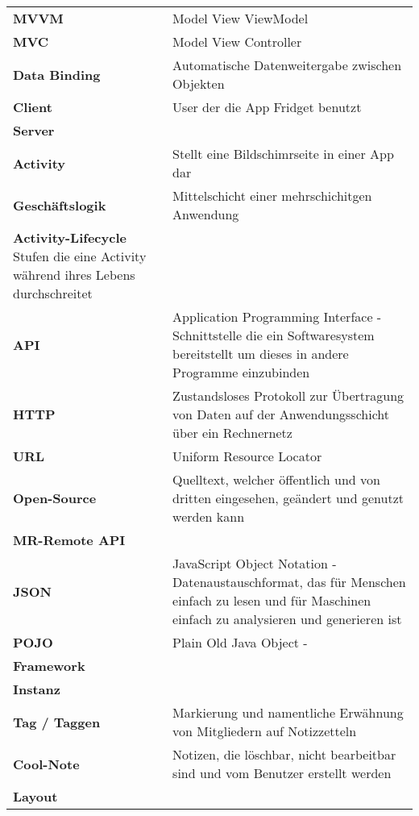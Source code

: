 \begin{table}[h!]
			\centering
			\label{my-label}
			\begin{tabular}{p{4cm}p{10cm}}
				\textbf{MVVM} & Model View ViewModel  \\
				\textbf{MVC} & Model View Controller  \\
				\textbf{Data Binding} & Automatische Datenweitergabe zwischen Objekten  \\
				\textbf{Client} & User der die App Fridget benutzt   \\
				
				\textbf{Server} &     \\
				\textbf{Activity} & Stellt eine Bildschimrseite in einer App dar   \\
				\textbf{Geschäftslogik} & Mittelschicht einer mehrschichitgen Anwendung  \\
				\textbf{Activity-Lifecycle} Stufen die eine Activity während ihres Lebens durchschreitet   \\
				
				\textbf{API} & Application Programming Interface - Schnittstelle die ein Softwaresystem bereitstellt um dieses in andere Programme einzubinden  \\
				
			
				\textbf{HTTP} & Zustandsloses Protokoll zur Übertragung von Daten auf der Anwendungsschicht über ein Rechnernetz  \\
				\textbf{URL} & Uniform Resource Locator  \\
				\textbf{Open-Source} & Quelltext, welcher öffentlich und von dritten eingesehen, geändert und genutzt werden kann  \\
				
				\textbf{MR-Remote API} &   \\ \todo{RAUS??}
				\textbf{JSON} & JavaScript Object Notation - Datenaustauschformat, das für Menschen einfach zu lesen und für Maschinen einfach zu analysieren und generieren ist   \\
				\textbf{POJO} & Plain Old Java Object  -   \\
				\textbf{Framework} &   \\
				
				\textbf{Instanz} &   \\
				\textbf{Tag / Taggen} &  Markierung und namentliche Erwähnung von Mitgliedern auf Notizzetteln
   \\
				\textbf{Cool-Note} & Notizen, die löschbar, nicht bearbeitbar sind und vom Benutzer erstellt werden   \\
				\textbf{Layout} &   \\
				

\end{tabular}
\end{table}
